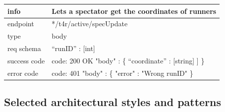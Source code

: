 \documentclass[titlepage]{article}
\begin{document}
	\vspace{\baselineskip}
	
	\begin{tabularx}{\textwidth}{lX} \hline
		info & Lets a spectator get the coordinates of runners \\ \hline
		endpoint & */t4r/active/specUpdate \\ \hline
		type & body \\ \hline
		req schema & 
		“runID” : [int] \\ \hline
		success code &
		code: 200 OK \newline  
		"body" : \{ \newline
		[ \newline
		“runnerName” : [string] \newline
		“coordinate” : [string] \newline
		] \newline
		\} \\ \hline
		error code &
		code: 401 \newline
		"body" : \{ "error" : "Wrong runID" \} \\ \hline
	\end{tabularx}
	
	\vspace{\baselineskip}
	
	\pagebreak
	
	
	
	\subsection{Selected architectural styles and patterns}
	
\end{document}
